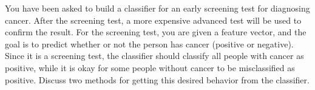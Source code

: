 You have been asked to build a classifier for an early screening test for diagnosing cancer. After the screening test, a more expensive advanced test will be used to confirm the result. For the screening test, you are given a feature vector, and the goal is to predict whether or not the person has cancer (positive or negative). Since it is a screening test, the classifier should classify all people with cancer as positive, while it is okay for some people without cancer to be misclassified as positive. Discuss two methods for getting this desired behavior from the classifier.
